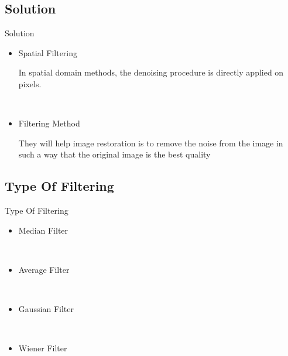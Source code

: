 \documentclass{beamer}
\begin{document}
\subsection{Solution}

\begin{frame}{Solution}

\begin{itemize}
	\item Spatial Filtering
	
	 In spatial domain methods, the denoising procedure is directly applied on pixels.

	
	\
	
	\item  Filtering Method
	
They will help image restoration is to remove the noise from the image in such a way that the original image is the best quality
	
	
\end{itemize}

\end{frame}

\subsection{Type Of Filtering}

\begin{frame}{Type Of Filtering}

\begin{itemize}
	\item Median Filter
	
	
	
	\
	
	\item  Average Filter
	
	
	\
	
		\item Gaussian Filter
		
	
	
	\
	
	\item  Wiener Filter
	
\end{itemize}

\end{frame}
\end{document}
